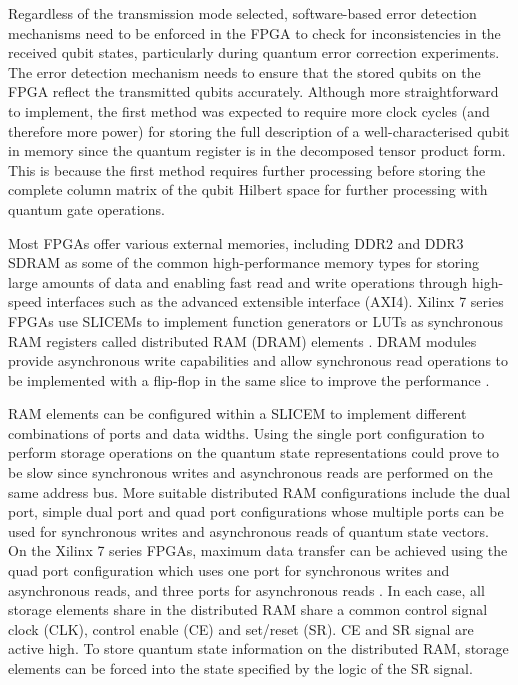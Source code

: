 Regardless of the transmission mode selected, software-based error detection mechanisms need to be enforced in the FPGA to check for inconsistencies in the received qubit states, particularly during quantum error correction experiments. The error detection mechanism needs to ensure that the stored qubits on the FPGA reflect the transmitted qubits accurately. Although more straightforward to implement, the first method was expected to require more clock cycles (and therefore more power) for storing the full description of a well-characterised qubit in memory since the quantum register is in the decomposed tensor product form. This is because the first method requires further processing before storing the complete column matrix of the qubit Hilbert space for further processing with quantum gate operations.

Most FPGAs offer various external memories, including DDR2 and DDR3 SDRAM as some of the common high-performance memory types for storing large amounts of data and enabling fast read and write operations through high-speed interfaces such as the advanced extensible interface (AXI4). Xilinx 7 series FPGAs use SLICEMs to implement function generators or LUTs as synchronous RAM registers called distributed RAM (DRAM) elements \cite{xilinx20167series}. DRAM modules provide asynchronous write capabilities and allow synchronous read operations to be implemented with a flip-flop in the same slice to improve the performance \cite{xilinx20167series}. 

RAM elements can be configured within a SLICEM to implement different combinations of ports and data widths. Using the single port configuration to perform storage operations on the quantum state representations could prove to be slow since synchronous writes and asynchronous reads are performed on the same address bus. More suitable distributed RAM configurations include the dual port, simple dual port and quad port configurations whose multiple ports can be used for synchronous writes and asynchronous reads of quantum state vectors. On the Xilinx 7 series FPGAs, maximum data transfer can be achieved using the quad port configuration which uses one port for synchronous writes and asynchronous reads, and three ports for asynchronous reads \cite{xilinx20167series}. In each case, all storage elements share in the distributed RAM share a common control signal clock (CLK), control enable (CE) and set/reset (SR). CE and SR signal are active high. To store quantum state information on the distributed RAM, storage elements can be forced into the state specified by the logic of the SR signal. 

